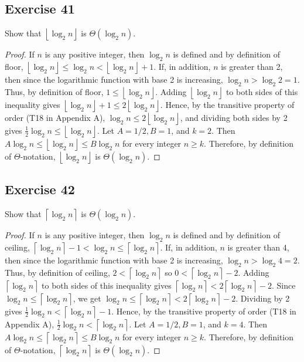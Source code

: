 \documentclass[14pt]{extarticle}
\newcommand{\floor}[1]{{\left\lfloor#1\right\rfloor}}
\newcommand{\ceil}[1]{{\left\lceil#1\right\rceil}}
\begin{document}
\subsection{Exercise 41}
Show that \(\floor{\log_2 n}\) is \(\Theta(\log_2 n)\).
\begin{proof}
    If \(n\) is any positive integer, then \(\log_2 n\) is defined and by definition of floor, \(\floor{\log_2 n}\leq \log_2 n <
    \floor{\log_2 n} + 1\). If, in addition, \(n\) is greater than 2, then since the logarithmic function with base 2 is
    increasing, \(\log_2 n > \log_2 2 = 1\). Thus, by definition of floor, \(1 \leq \floor{\log_2 n}\). Adding \(\floor{\log_2
        n}\) to both sides of this inequality gives \(\floor{\log_2 n} + 1 \leq 2 \floor{\log_2 n}\). Hence, by the transitive
    property of order (T18 in Appendix A), \(\log_2 n \leq 2 \floor{\log_2 n}\), and dividing both sides by 2 gives
    \(\frac{1}{2} \log_2 n \leq \floor{\log_2 n}\). Let \(A = 1/2, B = 1\), and \(k = 2\). Then \(A \log_2 n \leq \floor{\log_2
        n} \leq B \log_2 n\) for every integer \(n \geq k\). Therefore, by definition of \(\Theta\)-notation,
    \(\floor{\log_2 n}\) is \(\Theta(\log_2 n)\).
\end{proof}

\subsection{Exercise 42}
Show that \(\ceil{\log_2 n}\) is \(\Theta(\log_2 n)\).
\begin{proof}
    If \(n\) is any positive integer, then \(\log_2 n\) is defined and by definition of ceiling, \(\ceil{\log_2 n} - 1 < \log_2 n
    \leq \ceil{\log_2 n}\). If, in addition, \(n\) is greater than 4, then since the logarithmic function with base 2 is
    increasing, \(\log_2 n > \log_2 4 = 2\). Thus, by definition of ceiling, \(2<\ceil{\log_2 n}\) so \(0<\ceil{\log_2 n}- 2\).
    Adding \(\ceil{\log_2 n}\) to both sides of this inequality gives \(\ceil{\log_2 n} < 2 \ceil{\log_2 n}- 2\). Since
    \(\log_2 n \leq \ceil{\log_2 n}\), we get \(\log_2 n \leq \ceil{\log_2 n} < 2 \ceil{\log_2 n}- 2\). Dividing by 2 gives
    \(\frac{1}{2}\log_2 n < \ceil{\log_2 n} - 1\). Hence, by the transitive property of order (T18 in Appendix A),
    \(\frac{1}{2} \log_2 n < \ceil{\log_2 n}\). Let \(A = 1/2, B = 1\), and \(k = 4\). Then \(A \log_2 n \leq \ceil{\log_2 n}
    \leq B \log_2 n\) for every integer \(n \geq k\). Therefore, by definition of \(\Theta\)-notation,  \(\ceil{\log_2 n}\) is
    \(\Theta(\log_2 n)\).
\end{proof}
\end{document}
